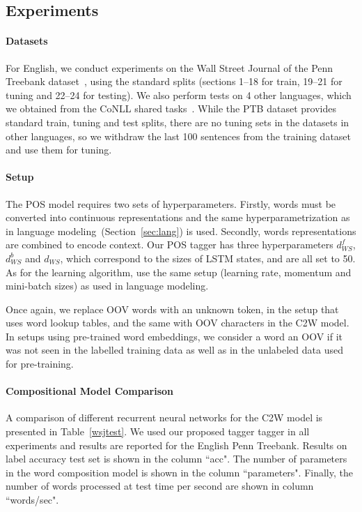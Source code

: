 \documentclass[11pt]{article}
\begin{document}
\begin{CJK*}{UTF8}{gbsn}
\subsection{Experiments}
\paragraph{Datasets}
For English, we conduct experiments on the Wall Street Journal of the Penn Treebank dataset~\cite{Marcus:1993:BLA:972470.972475}, using the standard splits (sections 1--18 for train, 19--21 for tuning and 22--24 for testing). We also perform tests on 4 other languages, which we obtained from the CoNLL shared tasks~\cite{marti2007cess,Brants02thetiger,pt,tr}. While the PTB dataset provides standard train, tuning and test splits, there are no tuning sets in the datasets in other languages, so we withdraw the last 100 sentences from the training dataset and use them for tuning. 

\paragraph{Setup}
The POS model requires two sets of hyperparameters. Firstly, words must be converted into continuous representations and the same hyperparametrization as in language modeling~(Section~\ref{sec:lang}) is used. Secondly, words representations are combined to encode context. Our POS tagger has three hyperparameters $d^f_{WS}$, $d^b_{WS}$ and $d_{WS}$, which correspond to the sizes of LSTM states, and are all set to 50. As for the learning algorithm, use the same setup (learning rate, momentum and mini-batch sizes) as used in language modeling.

Once again, we replace OOV words with an unknown token, in the setup that uses word lookup tables, and the same with OOV characters in the C2W model. In setups using pre-trained word embeddings, we consider a word an OOV if it was not seen in the labelled training data as well as in the unlabeled data used for pre-training.

\paragraph{Compositional Model Comparison}
A comparison of different recurrent neural networks for the C2W model is presented in Table~\ref{wsjtest}. We used our proposed tagger tagger in all experiments and results are reported for the English Penn Treebank. Results on label accuracy test set is shown in the column ``acc". The number of parameters in the word composition model is shown in the column ``parameters". Finally, the number of words processed at test time per second are shown in column ``words/sec".


\end{CJK*}
\end{document}
